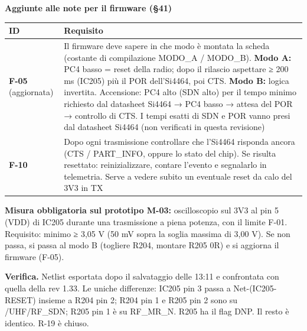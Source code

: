 \begin{notebox}
\textbf{Aggiunte alle note per il firmware (§41)}

\begin{center}{\small{}\setlength{\tabcolsep}{4pt}\renewcommand{\arraystretch}{1.1}
\begin{tabular}{>{\raggedright\arraybackslash}p{}>{\raggedright\arraybackslash}p{}}
\toprule
\textbf{ID} & \textbf{Requisito} \\
\midrule
\textbf{F-05} (aggiornata) & Il firmware deve sapere in che modo è montata la scheda (costante di compilazione MODO\_\allowbreak{}A /\allowbreak{} MODO\_\allowbreak{}B). \textbf{Modo A:} PC4 basso = reset della radio; dopo il rilascio aspettare ≥ 200 ms (IC205) più il POR dell'Si4464, poi CTS. \textbf{Modo B:} logica invertita. Accensione: PC4 alto (SDN alto) per il tempo minimo richiesto dal datasheet Si4464 → PC4 basso → attesa del POR → controllo di CTS. I tempi esatti di SDN e POR vanno presi dal datasheet Si4464 (non verificati in questa revisione) \\\midrule[0.15pt]
\textbf{F-10} & Dopo ogni trasmissione controllare che l'Si4464 risponda ancora (CTS /\allowbreak{} PART\_\allowbreak{}INFO, oppure lo stato del chip). Se risulta resettato: reinizializzare, contare l'evento e segnalarlo in telemetria. Serve a vedere subito un eventuale reset da calo del 3V3 in TX \\
\bottomrule
\end{tabular}}\end{center}

\textbf{Misura obbligatoria sul prototipo M-03:} oscilloscopio sul 3V3 al pin 5 (VDD) di IC205 durante una trasmissione a piena potenza, con il limite F-01. Requisito: minimo ≥ 3,05 V (50 mV sopra la soglia massima di 3,00 V). Se non passa, si passa al modo B (togliere R204, montare R205 0R) e si aggiorna il firmware (F-05).
\end{notebox}

\textbf{Verifica.} Netlist esportata dopo il salvataggio delle 13:11 e confrontata con quella della rev 1.33. Le uniche differenze: IC205 pin 3 passa a Net-(IC205-RESET) insieme a R204 pin 2; R204 pin 1 e R205 pin 2 sono su /\allowbreak{}UHF/\allowbreak{}RF\_\allowbreak{}SDN; R205 pin 1 è su RF\_\allowbreak{}MR\_\allowbreak{}N. R205 ha il flag DNP. Il resto è identico. R-19 è chiuso.

